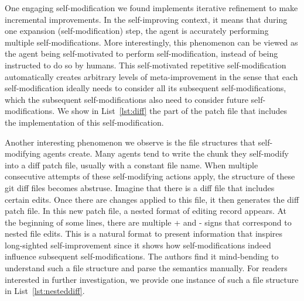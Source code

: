 \documentclass{article} %
\begin{document}
One engaging self-modification we found implements iterative refinement to make incremental improvements. In the self-improving context, it means that during one expansion (self-modification) step, the agent is accurately performing multiple self-modifications. More interestingly, this phenomenon can be viewed as the agent being self-motivated to perform self-modification, instead of being instructed to do so by humans. This self-motivated repetitive self-modification automatically creates arbitrary levels of meta-improvement in the sense that each self-modification ideally needs to consider all its subsequent self-modifications, which the subsequent self-modifications also need to consider future self-modifications. We show in List~\ref{lst:diff} the part of the patch file that includes the implementation of this self-modification.

Another interesting phenomenon we observe is the file structures that self-modifying agents create. Many agents tend to write the chunk they self-modify into a diff patch file, usually with a constant file name. When multiple consecutive attempts of these self-modifying actions apply, the structure of these git diff files becomes abstruse. Imagine that there is a diff file that includes certain edits. Once there are changes applied to this file, it then generates the diff patch file. In this new patch file, a nested format of editing record appears. At the beginning of some lines, there are multiple + and - signs that correspond to nested file edits. 
This is a natural format to present information that inspires long-sighted self-improvement since it shows how self-modifications indeed influence subsequent self-modifications.
The authors find it mind‑bending to understand such a file structure and parse the semantics manually. 
For readers interested in further investigation, we provide one instance of such a file structure in List~\ref{lst:nesteddiff}. 







\end{document}
